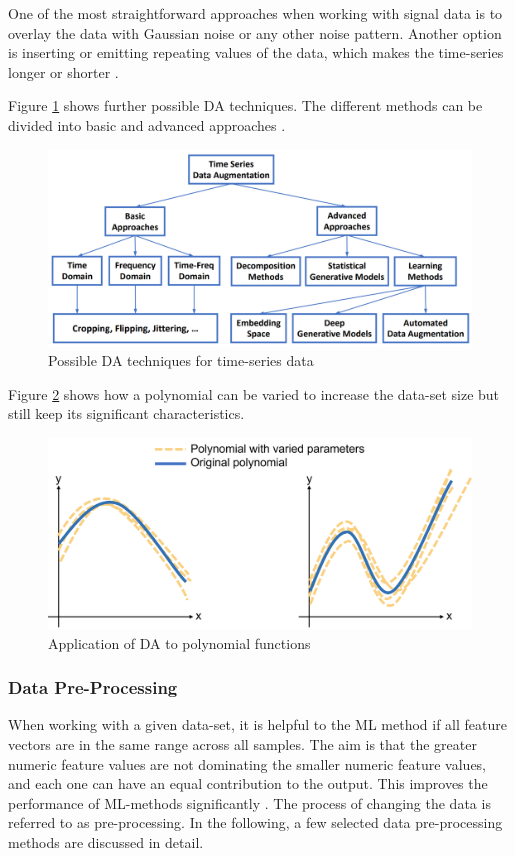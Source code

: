 One of the most straightforward approaches when working with signal data is to overlay the data with Gaussian noise or any other noise pattern. Another option is inserting or emitting repeating values of the data, which makes the time-series longer or shorter \cite{Wen}.

Figure \ref{fig:DA} shows further possible DA techniques. The different methods can be divided into basic and advanced approaches \cite{Wen}.

\begin{figure}[H]
	\centering
	\includegraphics[width=0.9\linewidth]{IMGs/DA.png}
	\caption{Possible DA techniques for time-series data \cite{Wen}}
	\label{fig:DA}
\end{figure}

Figure \ref{fig:DA2} shows how a polynomial can be varied to increase the data-set size but still keep its significant characteristics.

\begin{figure}[H]
	\centering
	\includegraphics[width=0.8\linewidth]{IMGs/DA2.png}
	\caption{Application of DA to polynomial functions}
	\label{fig:DA2}
\end{figure}

\subsubsection*{Data Pre-Processing}
When working with a given data-set, it is helpful to the ML method if all feature vectors are in the same range across all samples.
The aim is that the greater numeric feature values are not dominating the smaller numeric feature values, and each one can have an equal contribution to the output. This improves the performance of ML-methods significantly \cite{Singh}. The process of changing the data is referred to as pre-processing. In the following, a few selected data pre-processing methods are discussed in detail.

